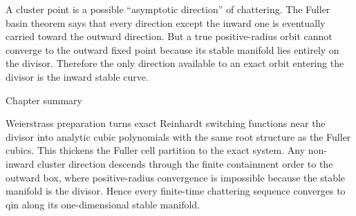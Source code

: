 A cluster point is a possible “asymptotic direction” of chattering. The Fuller basin theorem says that every direction except the inward one is eventually carried toward the outward direction. But a true positive-radius orbit cannot converge to the outward fixed point because its stable manifold lies entirely on the divisor. Therefore the only direction available to an exact orbit entering the divisor is the inward stable curve.


\begin{insightbox}{Chapter summary}
\end{insightbox}

Weierstrass preparation turns exact Reinhardt switching functions near the divisor into analytic cubic polynomials with the same root structure as the Fuller cubics. This thickens the Fuller cell partition to the exact system. Any non-inward cluster direction descends through the finite containment order to the outward box, where positive-radius convergence is impossible because the stable manifold is the divisor. Hence every finite-time chattering sequence converges to qin along its one-dimensional stable manifold.

